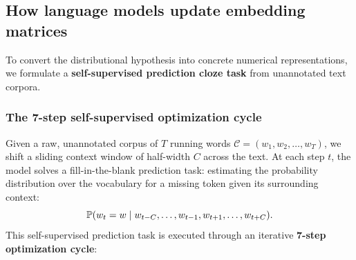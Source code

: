 \documentclass[../../main.tex]{subfiles}
\begin{document}
\subsection{How language models update embedding matrices}
\label{sec:embedding_training_loop}

To convert the distributional hypothesis into concrete numerical representations, we formulate a \textbf{self-supervised prediction cloze task} from unannotated text corpora.

\subsubsection{The 7-step self-supervised optimization cycle}
\label{subsec:seven_step_loop}

Given a raw, unannotated corpus of $T$ running words $\mathcal{C} = (w_1, w_2, \dots, w_T)$, we shift a sliding context window of half-width $C$ across the text. At each step $t$, the model solves a fill-in-the-blank prediction task: estimating the probability distribution over the vocabulary for a missing token given its surrounding context:
\begin{equation}
\label{eq:cloze_task}
\mathbb{P}(w_t = w \mid w_{t-C}, \dots, w_{t-1}, w_{t+1}, \dots, w_{t+C}).
\end{equation}
This self-supervised prediction task is executed through an iterative \textbf{7-step optimization cycle}:
\end{document}
